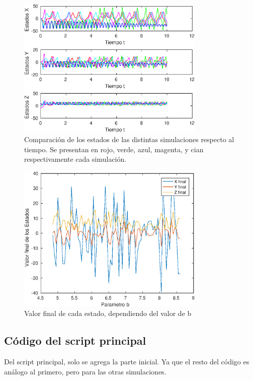 \documentclass[12pt,letterpaper]{article}
\begin{document}

\begin{figure}
	\centering
	\includegraphics[width=0.8\textwidth]{pictures/comparacion}
	\caption{Comparación de los estados de las distintas simulaciones respecto al tiempo. Se presentan en rojo, verde, azul, magenta, y cian respectivamente cada simulación.}
	\label{fig:comparacion}
\end{figure}

\begin{figure}
	\centering
	\includegraphics[width=0.8\textwidth]{pictures/sensibilidad}
	\caption{Valor final de cada estado, dependiendo del valor de b}
	\label{fig:sensibilidad}
\end{figure}

\subsection{Código del script principal}
Del script principal, solo se agrega la parte inicial. Ya que el resto del código es análogo al primero, pero para las otras simulaciones.


\end{document}
